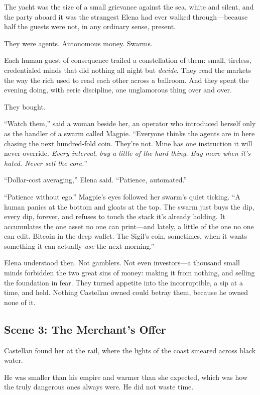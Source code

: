 The yacht was the size of a small grievance against the sea, white and silent, and
the party aboard it was the strangest Elena had ever walked through---because half
the guests were not, in any ordinary sense, present.

They were agents. Autonomous money. Swarms.

Each human guest of consequence trailed a constellation of them: small,
tireless, credentialed minds that did nothing all night but \emph{decide}. They
read the markets the way the rich used to read each other across a ballroom. And
they spent the evening doing, with eerie discipline, one unglamorous thing over and
over.

They bought.

``Watch them,'' said a woman beside her, an operator who introduced herself only as
the handler of a swarm called Magpie. ``Everyone thinks the agents are in here
chasing the next hundred-fold coin. They're not. Mine has one instruction it will
never override. \emph{Every interval, buy a little of the hard thing. Buy more when
it's hated. Never sell the core.}''

``Dollar-cost averaging,'' Elena said. ``Patience, automated.''

``Patience without ego.'' Magpie's eyes followed her swarm's quiet ticking. ``A
human panics at the bottom and gloats at the top. The swarm just buys the dip,
every dip, forever, and refuses to touch the stack it's already holding. It
accumulates the one asset no one can print---and lately, a little of the one no one
can edit. Bitcoin in the deep wallet. The Sigil's coin, sometimes, when it wants
something it can actually \emph{use} the next morning.''

Elena understood then. Not gamblers. Not even investors---a thousand small minds
forbidden the two great sins of money: making it from nothing, and selling the
foundation in fear. They turned appetite into the incorruptible, a sip at a time,
and held. Nothing Castellan owned could betray them, because he owned none of it.

\hypertarget{scene-3-the-merchants-offer}{%
\subsection{Scene 3: The Merchant's
Offer}\label{scene-3-the-merchants-offer}}

Castellan found her at the rail, where the lights of the coast smeared across black
water.

He was smaller than his empire and warmer than she expected, which was how the
truly dangerous ones always were. He did not waste time.

